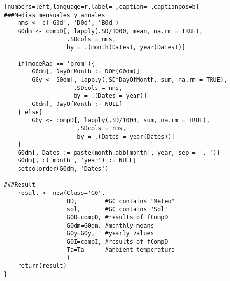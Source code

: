\begin{lstlisting}[numbers=left,language=r,label= ,caption= ,captionpos=b]
###Medias mensuales y anuales
    nms <- c('G0d', 'D0d', 'B0d')
    G0dm <- compD[, lapply(.SD/1000, mean, na.rm = TRUE),
                  .SDcols = nms,
                  by = .(month(Dates), year(Dates))]

    if(modeRad == 'prom'){
        G0dm[, DayOfMonth := DOM(G0dm)]
        G0y <- G0dm[, lapply(.SD*DayOfMonth, sum, na.rm = TRUE),
                    .SDcols = nms,
                    by = .(Dates = year)]
        G0dm[, DayOfMonth := NULL]        
    } else{
        G0y <- compD[, lapply(.SD/1000, sum, na.rm = TRUE),
                     .SDcols = nms,
                     by = .(Dates = year(Dates))]
    }
    G0dm[, Dates := paste(month.abb[month], year, sep = '. ')]
    G0dm[, c('month', 'year') := NULL]
    setcolorder(G0dm, 'Dates')

###Result
    result <- new(Class='G0',
                  BD,        #G0 contains "Meteo"
                  sol,       #G0 contains 'Sol'
                  G0D=compD, #results of fCompD
                  G0dm=G0dm, #monthly means
                  G0y=G0y,   #yearly values
                  G0I=compI, #results of fCompD
                  Ta=Ta      #ambient temperature
                  )
    return(result)
}
\end{lstlisting}
